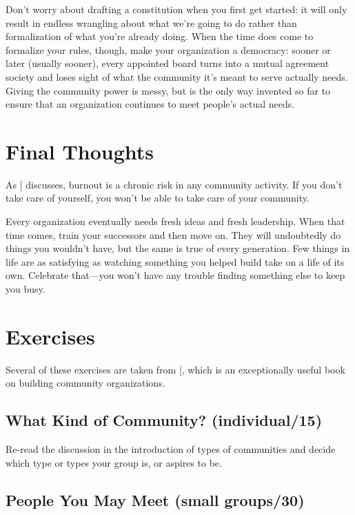 Don't worry about drafting a constitution when you first get started: it
will only result in endless wrangling about what we're going to do
rather than formalization of what you're already doing. When the time
does come to formalize your rules, though, make your organization a
democracy: sooner or later (usually sooner), every appointed board turns
into a mutual agreement society and loses sight of what the community
it's meant to serve actually needs. Giving the community power is
messy, but is the only way invented so far to ensure that an
organization continues to meet people's actual needs.

\section{Final Thoughts}\label{s:community-final}

As {[}\protect[\hyperlink{b:Pign2016}{Pign2016}]{]} discusses, burnout is a chronic risk in any
community activity. If you don't take care of yourself, you won't be
able to take care of your community.

Every organization eventually needs fresh ideas and fresh leadership.
When that time comes, train your successors and then move on. They will
undoubtedly do things you wouldn't have, but the same is true of every
generation. Few things in life are as satisfying as watching something
you helped build take on a life of its own. Celebrate that---you won't
have any trouble finding something else to keep you busy.

\section{Exercises}\label{s:community-exercises}

Several of these exercises are taken from {[}\protect[\hyperlink{b:Brow2007}{Brow2007}]{]}, which is
an exceptionally useful book on building community organizations.

\subsection{What Kind of Community? (individual/15)}\label{what-kind-of-community-individual15}

Re-read the discussion in the introduction of types of communities and
decide which type or types your group is, or aspires to be.

\subsection{People You May Meet (small groups/30)}\label{people-you-may-meet-small-groups30}

